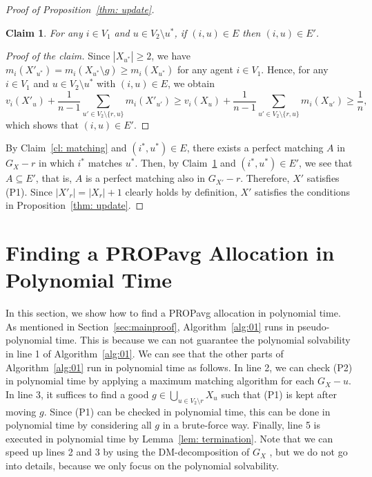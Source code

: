\documentclass[11pt]{article}
\newtheorem{claim}[theorem]{Claim}
\newcommand{\PROPavg}{\textsf{PROPavg}\xspace}
\begin{document}
\begin{proof}[Proof of Proposition~\ref{thm: update}]
\begin{claim}\label{cl: keepingedges}
For any $i\in V_1$ and $u\in V_2\setminus u^*$, if $(i, u) \in E$ then $(i, u)\in E'$. 
\end{claim}
\begin{proof}[Proof of the claim]
Since $|X_{u^*}|\ge 2$, we have $m_i(X'_{u^*})=m_i(X_{u^*}\setminus g)\ge m_i(X_{u^*})$ for any agent $i\in V_1$.
Hence, for any $i\in V_1$ and $u\in V_2\setminus u^*$ with $(i, u) \in E$, we obtain 
$$
v_i(X'_u) + \frac{1}{n-1}\sum_{u'\in V_2 \setminus \{r, u\}} m_i(X'_{u'}) \ge
v_i(X_u) + \frac{1}{n-1}\sum_{u'\in V_2 \setminus \{r, u\}} m_i(X_{u'}) \ge \frac{1}{n}, 
$$
which shows that $(i, u)\in E'$. 
\end{proof}

By Claim~\ref{cl: matching} and $(i^*, u^*)\in E$, there exists a perfect matching $A$ in $G_X-r$ in which $i^*$ matches $u^*$.
Then, by Claim~\ref{cl: keepingedges} and $(i^*, u^*)\in E'$, we see that $A \subseteq E'$, that is, $A$ is a perfect matching also in $G_{X'}-r$.
Therefore, $X'$ satisfies (P1).
Since $|X'_r|=|X_r|+1$ clearly holds by definition, 
$X'$ satisfies the conditions in Proposition~\ref{thm: update}. 
\end{proof}

\section{Finding a \PROPavg Allocation in Polynomial Time}\label{sec:poly}
In this section, we show how to find a \PROPavg allocation in polynomial time.
As mentioned in Section~\ref{sec:mainproof}, Algorithm~\ref{alg:01} runs in pseudo-polynomial time.
This is because we can not guarantee the polynomial solvability in line 1 of Algorithm~\ref{alg:01}.
We can see that the other parts of Algorithm~\ref{alg:01} run in polynomial time as follows.
In line 2, we can check (P2) in polynomial time by applying a maximum
matching algorithm for each $G_X - u$.
In line 3, it suffices to find a good $g \in \bigcup_{u \in V_2 \setminus
r} X_u$ such that (P1) is kept after moving $g$.
Since (P1) can be checked in polynomial time, 
this can be done in polynomial time by considering all $g$ in a
brute-force way.
Finally, line 5 is executed in polynomial time by Lemma~\ref{lem: termination}.
Note that we can speed up lines 2 and 3 by using the
DM-decomposition of $G_X$ \cite{dulmage1958coverings,
dulmage1959structure},
but we do not go into details, because we only focus on the polynomial solvability.
\end{document}
